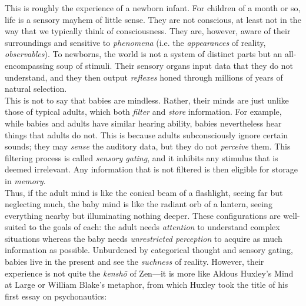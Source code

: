 







This is roughly the experience of a newborn infant. For children of a month or so, life is a sensory mayhem of little sense. They are not conscious, at least not in the way that we typically think of consciousness. They are, however, aware of their surroundings and sensitive to \textit{phenomena} (i.e. the \textit{appearances} of reality, \textit{observables}). To newborns, the world is not a system of distinct parts but an all-encompassing soup of stimuli. Their sensory organs input data that they do not understand, and they then output \textit{reflexes} honed through millions of years of natural selection. \\

This is not to say that babies are mindless. Rather, their minds are just unlike those of typical adults, which both \textit{filter} and \textit{store} information. For example, while babies and adults have similar hearing ability, babies nevertheless hear things that adults do not. This is because adults subconsciously ignore certain sounds; they may \textit{sense} the auditory data, but they do not \textit{perceive} them. This filtering process is called \textit{sensory gating}, and it inhibits any stimulus that is deemed irrelevant. Any information that is not filtered is then eligible for storage in \textit{memory}. \\

Thus, if the adult mind is like the conical beam of a flashlight, seeing far but neglecting much, the baby mind is like the radiant orb of a lantern, seeing everything nearby but illuminating nothing deeper. These configurations are well-suited to the goals of each: the adult needs \textit{attention} to understand complex situations whereas the baby needs \textit{unrestricted perception} to acquire as much information as possible. Unburdened by categorical thought and sensory gating, babies live in the present and see the \textit{suchness} of reality. However, their experience is not quite the \textit{kensh\=o} of Zen---it is more like Aldous Huxley's Mind at Large or William Blake's metaphor, from which Huxley took the title of his first essay on psychonautics: \\

